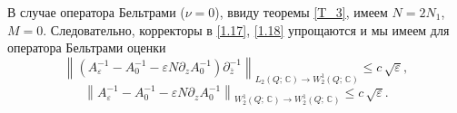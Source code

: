 В случае оператора Бельтрами ($\nu=0$), ввиду теоремы \ref{T_3}, имеем
$N=2N_1$, $M=0$. Следовательно, корректоры в \eqref{1.17}, \eqref{1.18} упрощаются
и мы имеем для оператора Бельтрами оценки
\begin{equation*}
\left\|\left(A_\varepsilon^{-1}-A_0^{-1}-\varepsilon N
\partial_zA_0^{-1}\right)
\partial_{\overline z}^{-1}
\right\|_{L_2(Q;\,\mathbb{C})\to W^1_2(Q;\,\mathbb{C})}
\leq c\,\sqrt\varepsilon,
\end{equation*}
\begin{equation*}
\left\|A_\varepsilon^{-1}-A_0^{-1}-\varepsilon N\partial_zA_0^{-1}
\right\|_{W^1_2(Q;\,\mathbb{C})\to W^1_2(Q;\,\mathbb{C})}
\leq c\,\sqrt\varepsilon.
\end{equation*}

